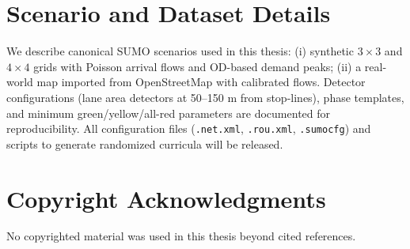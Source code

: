 \documentclass[12pt]{report} %
\begin{document}
\cleardoublepage
\appendix
{}
\setcounter{page}{1}
\chapter{Scenario and Dataset Details}
We describe canonical SUMO scenarios used in this thesis: (i) synthetic $3\times3$ and $4\times4$ grids with Poisson arrival flows and OD-based demand peaks; (ii) a real-world map imported from OpenStreetMap with calibrated flows. Detector configurations (lane area detectors at 50--150 m from stop-lines), phase templates, and minimum green/yellow/all-red parameters are documented for reproducibility. All configuration files (\texttt{.net.xml}, \texttt{.rou.xml}, \texttt{.sumocfg}) and scripts to generate randomized curricula will be released.

\chapter*{Copyright Acknowledgments}
No copyrighted material was used in this thesis beyond cited references.
\end{document}
